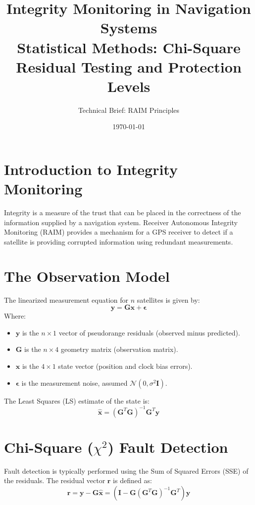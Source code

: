 \documentclass[11pt,a4paper]{article}
\title{
    \vspace{-2cm}
    \textbf{\huge Integrity Monitoring in Navigation Systems} \\
    \large Statistical Methods: Chi-Square Residual Testing and Protection Levels
}
\author{Technical Brief: RAIM Principles}
\date{\today}
\begin{document}
\maketitle

\section{Introduction to Integrity Monitoring}
Integrity is a measure of the trust that can be placed in the correctness of the information supplied by a navigation system. Receiver Autonomous Integrity Monitoring (RAIM) provides a mechanism for a GPS receiver to detect if a satellite is providing corrupted information using redundant measurements.

\section{The Observation Model}
The linearized measurement equation for $n$ satellites is given by:
\begin{equation}
    \mathbf{y} = \mathbf{G}\mathbf{x} + \bm{\epsilon}
\end{equation}
Where:
\begin{itemize}
    \item $\mathbf{y}$ is the $n \times 1$ vector of pseudorange residuals (observed minus predicted).
    \item $\mathbf{G}$ is the $n \times 4$ geometry matrix (observation matrix).
    \item $\mathbf{x}$ is the $4 \times 1$ state vector (position and clock bias errors).
    \item $\bm{\epsilon}$ is the measurement noise, assumed $\mathcal{N}(0, \sigma^2 \mathbf{I})$.
\end{itemize}

The Least Squares (LS) estimate of the state is:
\begin{equation}
    \hat{\mathbf{x}} = (\mathbf{G}^T \mathbf{G})^{-1} \mathbf{G}^T \mathbf{y}
\end{equation}

\section{Chi-Square ($\chi^2$) Fault Detection}
Fault detection is typically performed using the Sum of Squared Errors (SSE) of the residuals. The residual vector $\mathbf{r}$ is defined as:
\begin{equation}
    \mathbf{r} = \mathbf{y} - \mathbf{G}\hat{\mathbf{x}} = (\mathbf{I} - \mathbf{G}(\mathbf{G}^T \mathbf{G})^{-1} \mathbf{G}^T) \mathbf{y}
\end{equation}
\end{document}
